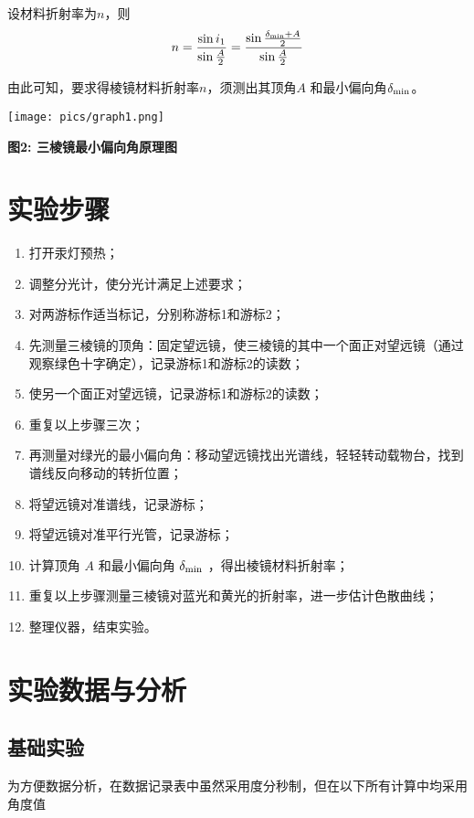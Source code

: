 \documentclass[10pt,a4paper]{article}	%
\makeatletter
\newenvironment{figurehere}
{\def\@captype{figure}}
{}
\makeatother
\begin{document}
	设材料折射率为$n$，则
	\[
		n= \frac{\sin i_1}{\sin\frac{A}{2}}=\frac{\sin\frac{\delta_{\rm min}+A}{2}}{\sin\frac{A}{2}}
	\]

	由此可知，要求得棱镜材料折射率$n$，须测出其顶角$A$ 和最小偏向角$\delta_{\rm min}$。

	\begin{figurehere}
		\centering
		\texttt{[image: pics/graph1.png]}
		\caption*{\bf 图2: 三棱镜最小偏向角原理图}
	\end{figurehere}

	\section{实验步骤}

    \begin{enumerate}
        \item 打开汞灯预热；
        \item 调整分光计，使分光计满足上述要求；
		\item 对两游标作适当标记，分别称游标1和游标2；
		\item 先测量三棱镜的顶角：固定望远镜，使三棱镜的其中一个面正对望远镜（通过观察绿色十字确定），记录游标1和游标2的读数；
		\item 使另一个面正对望远镜，记录游标1和游标2的读数；
		\item 重复以上步骤三次；
		\item 再测量对绿光的最小偏向角：移动望远镜找出光谱线，轻轻转动载物台，找到谱线反向移动的转折位置；
		\item 将望远镜对准谱线，记录游标；
		\item 将望远镜对准平行光管，记录游标；
		\item 计算顶角 $A$ 和最小偏向角 $\delta_{\rm min}$ ，得出棱镜材料折射率；
		\item 重复以上步骤测量三棱镜对蓝光和黄光的折射率，进一步估计色散曲线；
        \item 整理仪器，结束实验。
    \end{enumerate}

	\section{实验数据与分析}

	\subsection{基础实验}

	为方便数据分析，在数据记录表中虽然采用度分秒制，但在以下所有计算中均采用角度值
\end{document}
